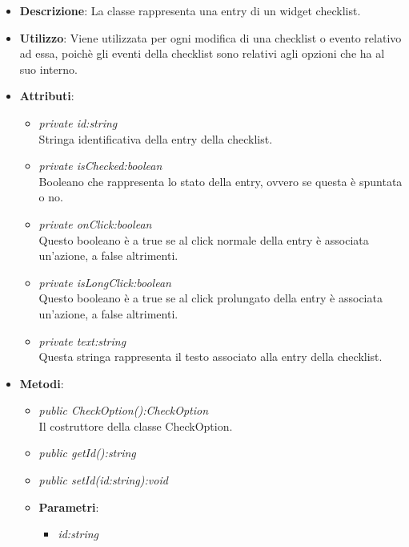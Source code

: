 \begin{itemize}
\item \textbf{Descrizione}: La classe rappresenta una entry di un widget checklist.
\item \textbf{Utilizzo}: Viene utilizzata per ogni modifica di una checklist o evento relativo ad essa, poichè gli eventi della checklist sono relativi agli opzioni che ha al suo interno.
\item \textbf{Attributi}:
	\begin{itemize}
	\item \textit{private id:string}\\
	Stringa identificativa della entry della checklist.
	\item \textit{private isChecked:boolean}\\
	Booleano che rappresenta lo stato della entry, ovvero se questa è spuntata o no.
	\item \textit{private onClick:boolean}\\
	Questo booleano è a true se al click normale della entry è associata un'azione, a false altrimenti.
	\item \textit{private isLongClick:boolean}\\
	Questo booleano è a true se al click prolungato della entry è associata un'azione, a false altrimenti.
	\item \textit{private text:string}\\
	Questa stringa rappresenta il testo associato alla entry della checklist.
	\end{itemize}
\item \textbf{Metodi}:
	\begin{itemize}
	\item \textit{public CheckOption():CheckOption}\\
	Il costruttore della classe CheckOption.
	\item \textit{public getId():string}\\
	
	\item \textit{public setId(id:string):void}\\
	
		\item{\textbf{Parametri}: \begin{itemize}
		\item \textit{id:string}\\
		

\end{itemize}}
\end{itemize}
\end{itemize}
